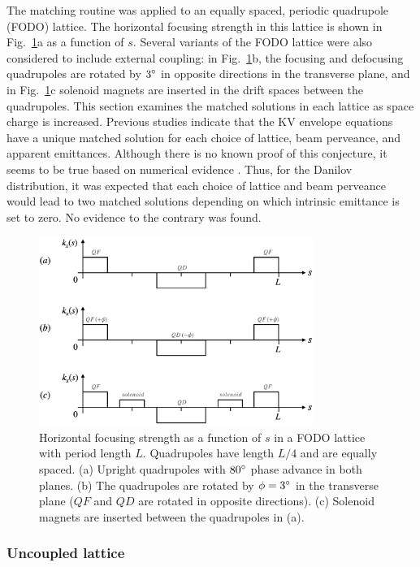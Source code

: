 The matching routine was applied to an equally spaced, periodic quadrupole (FODO) lattice. The horizontal focusing strength in this lattice is shown in Fig.~\ref{fig:fodo_lattices}a as a function of $s$. Several variants of the FODO lattice were also considered to include external coupling: in Fig.~\ref{fig:fodo_lattices}b, the focusing and defocusing quadrupoles are rotated by $3\degree$ in opposite directions in the transverse plane, and in Fig.~\ref{fig:fodo_lattices}c solenoid magnets are inserted in the drift spaces between the quadrupoles. This section examines the matched solutions in each lattice as space charge is increased. Previous studies indicate that the KV envelope equations have a unique matched solution for each choice of lattice, beam perveance, and apparent emittances. Although there is no known proof of this conjecture, it seems to be true based on numerical evidence \cite{Lund2006}. Thus, for the Danilov distribution, it was expected that each choice of lattice and beam perveance would lead to two matched solutions depending on which intrinsic emittance is set to zero. No evidence to the contrary was found.
%
\begin{figure}[!p]
    \centering
    \includegraphics[width=0.8\textwidth]{Images/chapter2/fodo_lattices.png}
    \caption{Horizontal focusing strength as a function of $s$ in a FODO lattice with period length $L$. Quadrupoles have length $L/4$ and are equally spaced. (a) Upright quadrupoles with $80\degree$ phase advance in both planes. (b) The quadrupoles are rotated by $\phi = 3\degree$ in the transverse plane ($QF$ and $QD$ are rotated in opposite directions). (c) Solenoid magnets are inserted between the quadrupoles in (a).}
    \label{fig:fodo_lattices}
\end{figure}


\subsubsection{Uncoupled lattice}

